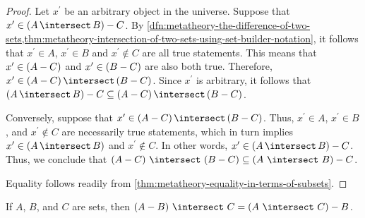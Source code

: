 \begin{proof}
    Let \( x^{\prime} \) be an arbitrary object in the universe.
    Suppose that \( x^{\prime} \in \mleft( A \,{\intersect}\, B \mright) - C \).
    By \cref{dfn:metatheory-the-difference-of-two-sets,thm:metatheory-intersection-of-two-sets-using-set-builder-notation},
    it follows that \( x^{\prime} \in A \), \( x^{\prime} \in B \) and \( x^{\prime} \notin C \) are all true statements.
    This means that \( x^{\prime} \in \mleft( A - C \mright) \) and \( x^{\prime} \in \mleft( B - C \mright) \) are also both true.
    Therefore, \( x^{\prime} \in \mleft( A - C \mright) \,{\intersect}\, \mleft( B - C \mright) \).
    Since \( x^{\prime} \) is arbitrary, it follows that \( \mleft( A \,{\intersect}\, B \mright) - C \subseteq \mleft( A - C \mright) \,{\intersect}\, \mleft( B - C \mright) \).

    \vspace{0.3cm}
    \noindent
    Conversely, suppose that \( x^{\prime} \in \mleft( A - C \mright) \,{\intersect}\, \mleft( B - C \mright) \).
    Thus, \( x^{\prime} \in A \), \( x^{\prime} \in B \), and \( x^{\prime} \notin C \) are necessarily true statements,
    which in turn implies \( x^{\prime} \in \mleft( A \,{\intersect}\, B \mright) \) and \( x^{\prime} \notin C \).
    In other words, \( x^{\prime} \in \mleft( A \,{\intersect}\, B \mright) - C \).
    Thus, we conclude that \( \mleft( A - C \mright) \,\,{\intersect}\,\, \mleft( B - C \mright) \subseteq \mleft( A \,\,{\intersect}\,\, B \mright) - C \).

    \vspace{0.3cm}
    \noindent
    Equality follows readily from \cref{thm:metatheory-equality-in-terms-of-subsets}.
\end{proof}

\begin{thm}
     \label{thm:metatheory-difference-and-intersection-swapped-in-mixed-operations}
    If \( A \), \( B \), and \( C \) are sets, then \( \mleft( A - B \mright) \,\,{\intersect}\,\, C = \mleft( A \,\,{\intersect}\,\, C \mright) - B  \).
\end{thm}

